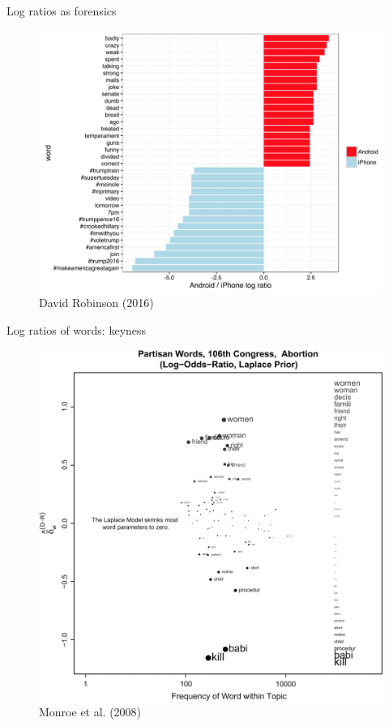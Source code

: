 \documentclass{hertieteaching}
\begin{document}
\begin{frame}{Log ratios as forensics}
\protect\hypertarget{log-ratios-as-forensics}{}

\begin{figure}

{\centering \includegraphics[width=0.8\linewidth]{pictures/trumptweets} 

}

\caption{David Robinson (2016)}\label{fig:unnamed-chunk-9}
\end{figure}

\end{frame}

\begin{frame}{Log ratios of words: keyness}
\protect\hypertarget{log-ratios-of-words-keyness}{}

\begin{figure}

{\centering \includegraphics[width=0.7\linewidth]{pictures/fightin1} 

}

\caption{Monroe et al. (2008)}\label{fig:unnamed-chunk-10}
\end{figure}

\end{frame}
\end{document}
